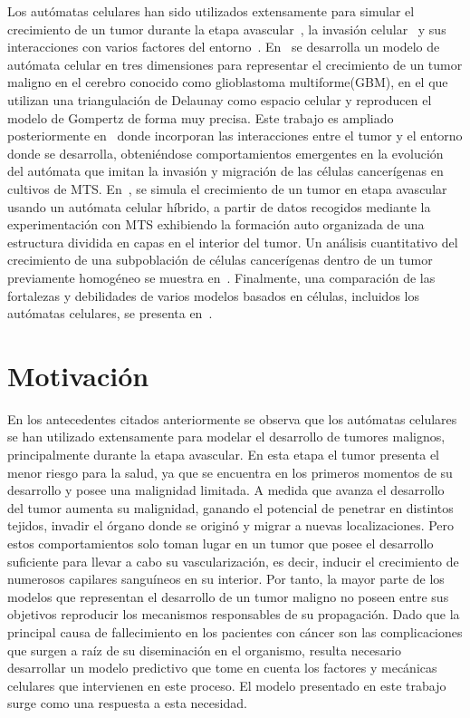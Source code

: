 Los aut\'omatas celulares han sido utilizados extensamente para simular el crecimiento de un tumor durante la etapa avascular~\cite{dormann,kansal2}, la invasi\'on celular~\cite{anderson} y sus interacciones con varios factores del entorno~\cite{rejniak}. En~\cite{kansal} se desarrolla un modelo de aut\'omata celular en tres dimensiones para representar el crecimiento de un tumor maligno en el cerebro conocido como glioblastoma multiforme(GBM), en el que utilizan una triangulaci\'on de Delaunay como espacio celular y reproducen el modelo de Gompertz de forma muy precisa. Este trabajo es ampliado posteriormente en~\cite{kansal3} donde incorporan las interacciones entre el tumor y el entorno donde se desarrolla, obteni\'endose comportamientos emergentes en la evoluci\'on del aut\'omata que imitan la invasi\'on y migraci\'on de las c\'elulas cancer\'igenas en cultivos de MTS. En~\cite{dormann}, se simula el crecimiento de un tumor en etapa avascular usando un aut\'omata celular h\'ibrido, a partir de datos recogidos mediante la experimentaci\'on con MTS exhibiendo la formaci\'on auto organizada de una estructura dividida en capas en el interior del tumor. Un an\'alisis cuantitativo del crecimiento de una subpoblaci\'on de c\'elulas cancer\'igenas dentro de un tumor previamente homog\'eneo se muestra en~\cite{kansal2}. Finalmente, una comparaci\'on de las fortalezas y debilidades de varios modelos basados en c\'elulas, incluidos los aut\'omatas celulares, se presenta en~\cite{rejniak}.

\section{Motivaci\'on}
En los antecedentes citados anteriormente se observa que los aut\'omatas celulares se han utilizado extensamente para modelar el desarrollo de tumores malignos, principalmente durante la etapa avascular. En esta etapa el tumor presenta el menor riesgo para la salud, ya que se encuentra en los primeros momentos de su desarrollo y posee una malignidad limitada. A medida que avanza el desarrollo del tumor aumenta su malignidad, ganando el potencial de penetrar en distintos tejidos, invadir el \'organo donde se origin\'o y migrar a nuevas localizaciones. Pero estos comportamientos solo toman lugar en un tumor que posee el desarrollo suficiente para llevar a cabo su vascularizaci\'on, es decir, inducir el crecimiento de numerosos capilares sangu\'ineos en su interior. Por tanto, la mayor parte de los modelos que representan el desarrollo de un tumor maligno no poseen entre sus objetivos reproducir los mecanismos responsables de su propagaci\'on. Dado que la principal causa de fallecimiento en los pacientes con c\'ancer son las complicaciones que surgen a ra\'iz de su diseminaci\'on en el organismo, resulta necesario desarrollar un modelo predictivo que tome en cuenta los factores y mec\'anicas celulares que intervienen en este proceso. El modelo presentado en este trabajo surge como una respuesta a esta necesidad. 

